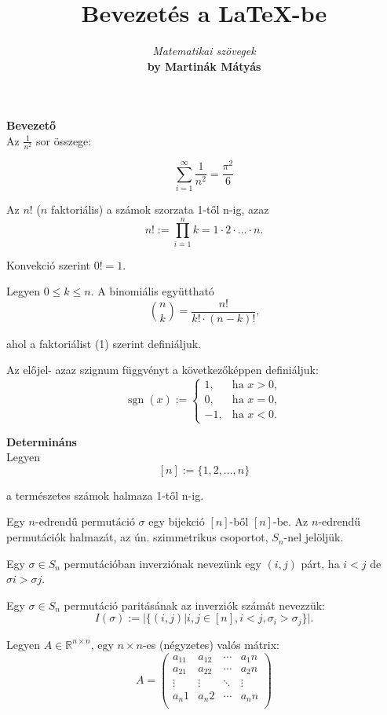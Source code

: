 \documentclass{article}
\begin{document}
	\begin{titlepage}
		\title{\Huge{Bevezetés a \LaTeX-be}}
		\author{\Large{\textit{Matematikai szövegek}\\
				\textbf{by Martinák Mátyás}}}
		\date{}
		\maketitle
	\end{titlepage}
	\textbf{Bevezető}\\
	
	Az $\frac{1}{n^2} $ sor összege:
	
	\[\sum_{i=1}^\infty\frac{1}{n^2}=\frac{\pi^2}{6}\]
	
	Az $n!$ ($n$ faktoriális) a számok szorzata 1-től n-ig, azaz
	\begin{equation}
		n! := \prod_{i=1}^n k = 1 \cdot 2 \cdot ...\cdot n\text{.}
	\end{equation}
	
	Konvekció szerint $0! = 1$.
	
	Legyen $0 \leq k \leq n$. A binomiális együttható
	\[\binom{n}{k} = \frac{n!}{k! \cdot (n-k)!}\text{,}\]
	
	ahol a faktoriálist (1) szerint definiáljuk.
	
	Az előjel- azaz szignum függvényt a következőképpen definiáljuk:
	\[\operatorname{sgn}(x) := \begin{cases}
		1, & \text{ha } x > 0, \\
		0, & \text{ha } x = 0, \\
		-1, & \text{ha } x < 0.
	\end{cases}\]
	
	\textbf{Determináns}\\
	
	Legyen
	\[[n] := \lbrace1, 2, ..., n\rbrace\]
	
	a természetes számok halmaza 1-től n-ig.
	
	Egy $n$-edrendű $\text{permutáció }\sigma$ egy bijekció $[n]$-ből $[n]$-be. Az $n$-edrendű permutációk halmazát, az ún. szimmetrikus csoportot, $S_n$-nel jelöljük.
	
	Egy $\sigma \in S_n$ permutációban inverziónak nevezünk egy $(i, j)$ párt, ha $i < j$
	de $\sigma i > \sigma j$.
	
	Egy $\sigma \in S_n$ permutáció paritásának az inverziók számát nevezzük:
	\[I(\sigma) := \vert\lbrace(i, j) \vert i, j \in [n], i < j, \sigma_i > \sigma_j \rbrace\vert.\]
	
	Legyen $A \in \mathbb{R}^{n \times n} \text{, egy }n \times n$-es (négyzetes) valós mátrix:
	\[ A = \left( \begin{matrix}
		a_11 & a_12 & \cdots & a_1n \\
		a_21 & a_22 & \cdots & a_2n \\
		\vdots & \vdots & \ddots & \vdots \\
		a_n1 & a_n2 & \cdots & a_nn \\
	\end{matrix} \right) \]
	
\end{document}
